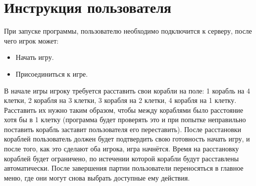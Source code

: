\documentclass[a4paper,14pt]{extarticle} %
\begin{document}
\section*{Инструкция пользователя}
При запуске программы, пользователю необходимо подключится к серверу, после чего игрок может:
\begin{itemize}
\item{Начать игру.}
\item{Присоединиться к игре.}

\end{itemize}
В начале игры игроку требуется расставить свои корабли на поле: 1 корабль на 4 клетки, 2 корабля на 3 клетки, 3 корабля на 2 клетки, 4 корабля на 1 клетку. Расставить их нужно таким образом, чтобы между кораблями было расстояние хотя бы в 1 клетку (программа будет проверять это и при попытке неправильно поставить корабль заставит пользователя его переставить). После расстановки кораблей пользователь должен будет подтвердить свою готовность начать игру, и после того, как это сделают оба игрока, игра начнётся. Время на расстановку кораблей будет ограничено, по истечении которой корабли будут расставлены автоматически. После завершения партии пользователи переносяться в главное меню, где они могут снова выбрать доступные ему действия.

\newpage
\end{document}
